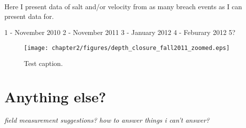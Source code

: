 Here I present data of salt and/or velocity from as many breach events as I can present data for.

1 - November 2010
2 - November 2011
3 - January 2012
4 - Feburary 2012
5?


\begin{figure}
  \texttt{[image: chapter2/figures/depth\_closure\_fall2011\_zoomed.eps]}
    \caption{Test caption.}
 \label{depthclosuref11}
 \end{figure}


\section{Anything else?}
\label{backofch2}

\emph{field measurement suggestions? how to answer things i can't answer?}


